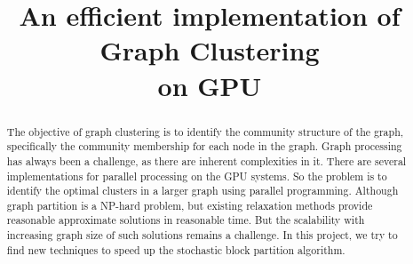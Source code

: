\documentclass[conference]{IEEEtran}
\begin{document}
	\title{An efficient implementation of Graph Clustering\\ on GPU\\}

	\author{
		\and
	}

	\maketitle


	\begin{abstract}
		The objective of graph clustering is to identify the community structure of the graph, specifically the community membership for each node in the graph. Graph  processing  has  always  been  a  challenge,  as there  are  inherent  complexities  in  it. There are several implementations for parallel processing on the GPU systems. So the problem is to identify the optimal clusters in a larger graph using parallel programming. Although graph partition is a NP-hard problem, but existing relaxation methods provide reasonable approximate solutions in reasonable time. But the scalability with increasing
graph size of such solutions remains a challenge. In this project,
we try to find new techniques to speed up the stochastic
block partition algorithm.
	\end{abstract}

\end{document}
